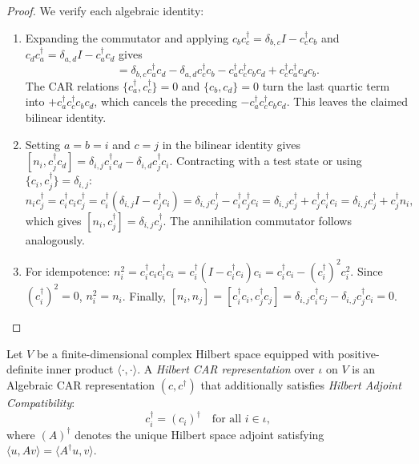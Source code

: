 \begin{proof}
We verify each algebraic identity:
\begin{enumerate}
    \item Expanding the commutator and applying $c_b c_c^\dagger=\delta_{b,c}I-c_c^\dagger c_b$ and $c_d c_a^\dagger=\delta_{a,d}I-c_a^\dagger c_d$ gives
    \begin{equation}
    [c_a^\dagger c_b,c_c^\dagger c_d]
    =\delta_{b,c}c_a^\dagger c_d-\delta_{a,d}c_c^\dagger c_b
    -c_a^\dagger c_c^\dagger c_b c_d+c_c^\dagger c_a^\dagger c_d c_b.
    \end{equation}
    The CAR relations $\{c_a^\dagger,c_c^\dagger\}=0$ and $\{c_b,c_d\}=0$ turn the last quartic term into $+c_a^\dagger c_c^\dagger c_b c_d$, which cancels the preceding $-c_a^\dagger c_c^\dagger c_b c_d$. This leaves the claimed bilinear identity.
    \item Setting $a = b = i$ and $c = j$ in the bilinear identity gives $[n_i, c_j^\dagger c_d] = \delta_{i, j} c_i^\dagger c_d - \delta_{i, d} c_j^\dagger c_i$. Contracting with a test state or using $\{c_i, c_j^\dagger\} = \delta_{i,j}$:
    \begin{equation}
    n_i c_j^\dagger = c_i^\dagger c_i c_j^\dagger = c_i^\dagger (\delta_{i, j} I - c_j^\dagger c_i) = \delta_{i, j} c_j^\dagger - c_i^\dagger c_j^\dagger c_i = \delta_{i, j} c_j^\dagger + c_j^\dagger c_i^\dagger c_i = \delta_{i, j} c_j^\dagger + c_j^\dagger n_i,
    \end{equation}
    which gives $[n_i, c_j^\dagger] = \delta_{i, j} c_j^\dagger$. The annihilation commutator follows analogously.
    
    \item For idempotence: $n_i^2 = c_i^\dagger c_i c_i^\dagger c_i = c_i^\dagger (I - c_i^\dagger c_i) c_i = c_i^\dagger c_i - (c_i^\dagger)^2 c_i^2$. Since $(c_i^\dagger)^2 = 0$, $n_i^2 = n_i$. Finally, $[n_i, n_j] = [c_i^\dagger c_i, c_j^\dagger c_j] = \delta_{i, j} c_i^\dagger c_j - \delta_{i, j} c_j^\dagger c_i = 0$.
\end{enumerate}
\end{proof}

\begin{definition}
Let $V$ be a finite-dimensional complex Hilbert space equipped with positive-definite inner product $\langle \cdot, \cdot \rangle$. A \emph{Hilbert CAR representation} over $\iota$ on $V$ is an Algebraic CAR representation $(c, c^\dagger)$ that additionally satisfies \emph{Hilbert Adjoint Compatibility}:
\begin{equation}
c_i^\dagger = (c_i)^\dagger \quad \text{for all } i \in \iota,
\end{equation}
where $(A)^\dagger$ denotes the unique Hilbert space adjoint satisfying $\langle u, A v \rangle = \langle A^\dagger u, v \rangle$.
\end{definition}

